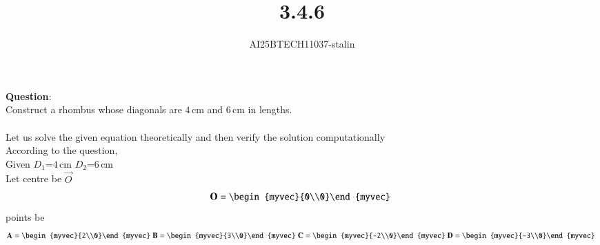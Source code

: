 \documentclass[journal]{IEEEtran}
\begin{document}

\vspace{3cm}

\title{3.4.6}
\author{AI25BTECH11037-stalin}
 \maketitle
{\let\newpage\relax\maketitle}
\renewcommand{\thefigure}{\theenumi}
\renewcommand{\thetable}{\theenumi}
\setlength{\intextsep}{10pt} %
\renewcommand{\thetable}{\theenumi}
\textbf{Question}:\\
Construct a rhombus whose diagonals are \(4 \, \text{cm}\) and \(6 \, \text{cm}\) in lengths.\\
\solution \\
Let us solve the given equation theoretically and then verify the solution computationally \\
According to the question, \\
Given $D_1$=\(4 \, \text{cm}\) $D_2$=\(6 \, \text{cm}\)\\
Let centre be $\vec{O}$ 
\begin{align}
  \vec{O}=\begin{myvec}{0\\0}\end{myvec}\;
  \end{align}
points be
  \begin{align}
  \vec{A}=\begin{myvec}{2\\0}\end{myvec}\;
  \vec{B}=\begin{myvec}{3\\0}\end{myvec}\;
\vec{C}=\begin{myvec}{-2\\0}\end{myvec}\
  \vec{D}=\begin{myvec}{-3\\0}\end{myvec}\
   \end{align}
   
\end{document}
